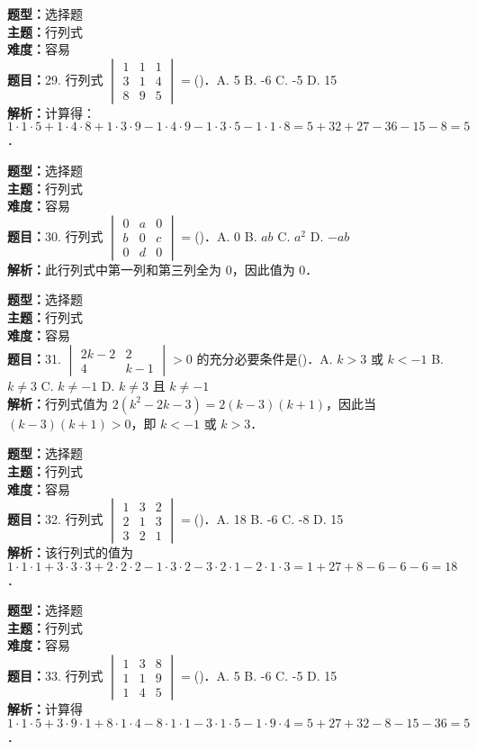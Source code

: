 \documentclass{ctexart}
\newenvironment{question}[5]{%
	\noindent\textbf{题型：}#1\\
	\textbf{主题：}#2\\
	\textbf{难度：}#3\\
	\textbf{题目：}#4\\
	\textbf{解析：}#5\\
	\vspace{1em}
}{}
\begin{document}
	\begin{question}
		{选择题}
		{行列式}
		{容易}
		{29. 行列式 \(\begin{vmatrix} 1 & 1 & 1 \\ 3 & 1 & 4 \\ 8 & 9 & 5\end{vmatrix}=\)(\qquad)．A. 5 B. -6 C. -5 D. 15}
		{计算得：\(1 \cdot 1 \cdot 5 + 1 \cdot 4 \cdot 8 + 1 \cdot 3 \cdot 9 - 1 \cdot 4 \cdot 9 - 1 \cdot 3 \cdot 5 - 1 \cdot 1 \cdot 8 = 5 + 32 + 27 - 36 - 15 - 8 = 5\)．}
	\end{question}
	
	\begin{question}
		{选择题}
		{行列式}
		{容易}
		{30. 行列式 \(\begin{vmatrix} 0 & a & 0 \\ b & 0 & c \\ 0 & d & 0\end{vmatrix}=\)(\qquad)．A. 0 B. \(ab\) C. \(a^2\) D. \(-ab\)}
		{此行列式中第一列和第三列全为 0，因此值为 0．}
	\end{question}
	
	\begin{question}
		{选择题}
		{行列式}
		{容易}
		{31. \(\begin{vmatrix} 2k - 2 & 2 \\ 4 & k - 1\end{vmatrix} > 0\) 的充分必要条件是(\qquad)．A. \(k > 3\) 或 \(k < -1\) B. \(k \neq 3\) C. \(k \neq -1\) D. \(k \neq 3\) 且 \(k \neq -1\)}
		{行列式值为 \(2(k^2 - 2k - 3) = 2(k - 3)(k + 1)\)，因此当 \((k - 3)(k + 1) > 0\)，即 \(k < -1\) 或 \(k > 3\)．}
	\end{question}
	
	\begin{question}
		{选择题}
		{行列式}
		{容易}
		{32. 行列式 \(\begin{vmatrix} 1 & 3 & 2 \\ 2 & 1 & 3 \\ 3 & 2 & 1\end{vmatrix}=\)(\qquad)．A. 18 B. -6 C. -8 D. 15}
		{该行列式的值为 \(1 \cdot 1 \cdot 1 + 3 \cdot 3 \cdot 3 + 2 \cdot 2 \cdot 2 - 1 \cdot 3 \cdot 2 - 3 \cdot 2 \cdot 1 - 2 \cdot 1 \cdot 3 = 1 + 27 + 8 - 6 - 6 - 6 = 18\)．}
	\end{question}
	
	\begin{question}
		{选择题}
		{行列式}
		{容易}
		{33. 行列式 \(\begin{vmatrix} 1 & 3 & 8 \\ 1 & 1 & 9 \\ 1 & 4 & 5\end{vmatrix}=\)(\qquad)．A. 5 B. -6 C. -5 D. 15}
		{计算得 \(1 \cdot 1 \cdot 5 + 3 \cdot 9 \cdot 1 + 8 \cdot 1 \cdot 4 - 8 \cdot 1 \cdot 1 - 3 \cdot 1 \cdot 5 - 1 \cdot 9 \cdot 4 = 5 + 27 + 32 - 8 - 15 - 36 = 5\)．}
	\end{question}
	
\end{document}
